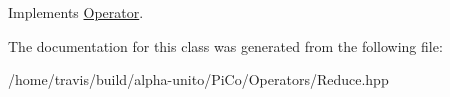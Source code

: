 \-Implements \hyperlink{class_operator}{\-Operator}.



\-The documentation for this class was generated from the following file\-:\begin{DoxyCompactItemize}
\item 
/home/travis/build/alpha-\/unito/\-Pi\-Co/\-Operators/\-Reduce.\-hpp\end{DoxyCompactItemize}
